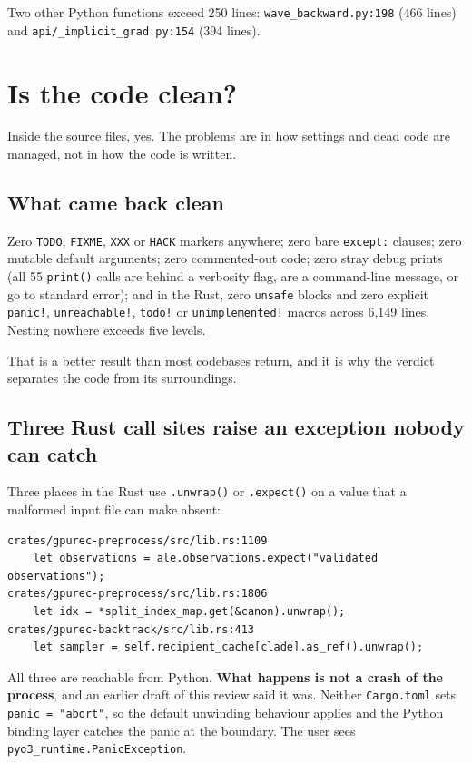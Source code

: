 \documentclass[11pt]{article}
\newcommand{\loc}[1]{\nolinkurl{#1}}
\newcommand{\dir}[1]{\nolinkurl{#1}}
\begin{document}
Two other Python functions exceed 250 lines: \loc{wave\_backward.py:198} (466
lines) and \loc{api/\_implicit\_grad.py:154} (394 lines).

\section{Is the code clean?}

Inside the source files, yes.  The problems are in how settings and dead code
are managed, not in how the code is written.

\subsection{What came back clean}

Zero \texttt{TODO}, \texttt{FIXME}, \texttt{XXX} or \texttt{HACK} markers
anywhere; zero bare \texttt{except:} clauses; zero mutable default arguments;
zero commented-out code; zero stray debug prints (all 55 \texttt{print()} calls
are behind a verbosity flag, are a command-line message, or go to standard
error); and in the Rust, zero \texttt{unsafe} blocks and zero explicit
\texttt{panic!}, \texttt{unreachable!}, \texttt{todo!} or
\texttt{unimplemented!} macros across 6{,}149 lines.  Nesting nowhere exceeds
five levels.

That is a better result than most codebases return, and it is why the verdict
separates the code from its surroundings.

\subsection{Three Rust call sites raise an exception nobody can catch}
\label{sec:rust}

Three places in the Rust use \texttt{.unwrap()} or \texttt{.expect()} on a value
that a malformed input file can make absent:

\begin{lstlisting}
crates/gpurec-preprocess/src/lib.rs:1109
    let observations = ale.observations.expect("validated observations");
crates/gpurec-preprocess/src/lib.rs:1806
    let idx = *split_index_map.get(&canon).unwrap();
crates/gpurec-backtrack/src/lib.rs:413
    let sampler = self.recipient_cache[clade].as_ref().unwrap();
\end{lstlisting}

All three are reachable from Python.  \textbf{What happens is not a crash of the
process}, and an earlier draft of this review said it was.  Neither
\dir{Cargo.toml} sets \texttt{panic = "abort"}, so the default unwinding
behaviour applies and the Python binding layer catches the panic at the
boundary.  The user sees \texttt{pyo3\_runtime.PanicException}.
\end{document}
